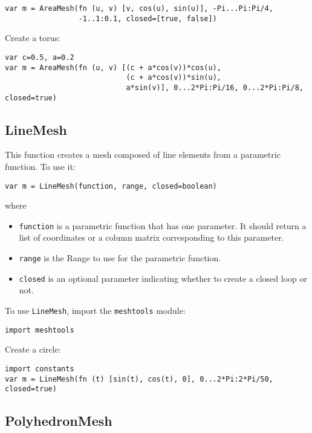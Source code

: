 \begin{lstlisting}
var m = AreaMesh(fn (u, v) [v, cos(u), sin(u)], -Pi...Pi:Pi/4,
                 -1..1:0.1, closed=[true, false])
\end{lstlisting}

Create a torus:

\begin{lstlisting}
var c=0.5, a=0.2
var m = AreaMesh(fn (u, v) [(c + a*cos(v))*cos(u),
                            (c + a*cos(v))*sin(u),
                            a*sin(v)], 0...2*Pi:Pi/16, 0...2*Pi:Pi/8, closed=true)
\end{lstlisting}

\hypertarget{linemesh}{%
\subsection{LineMesh}\label{linemesh}}

This function creates a mesh composed of line elements from a parametric
function. To use it:

\begin{lstlisting}
var m = LineMesh(function, range, closed=boolean)
\end{lstlisting}

where

\begin{itemize}

\item
  \texttt{function} is a parametric function that has one parameter. It
  should return a list of coordinates or a column matrix corresponding
  to this parameter.
\item
  \texttt{range} is the Range to use for the parametric function.
\item
  \texttt{closed} is an optional parameter indicating whether to create
  a closed loop or not.
\end{itemize}

To use \texttt{LineMesh}, import the \texttt{meshtools} module:

\begin{lstlisting}
import meshtools
\end{lstlisting}

Create a circle:

\begin{lstlisting}
import constants
var m = LineMesh(fn (t) [sin(t), cos(t), 0], 0...2*Pi:2*Pi/50, closed=true)
\end{lstlisting}

\hypertarget{polyhedronmesh}{%
\subsection{PolyhedronMesh}\label{polyhedronmesh}}

